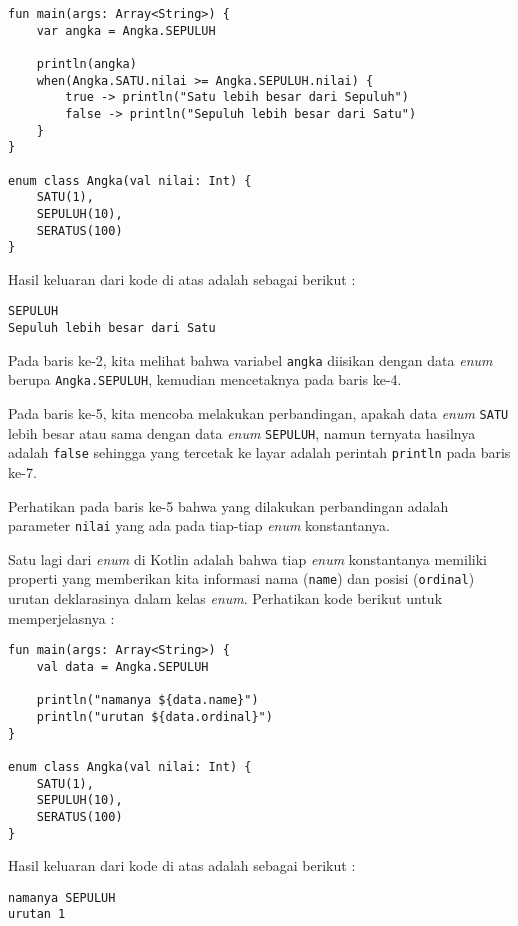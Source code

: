 \begin{lstlisting}
fun main(args: Array<String>) {
	var angka = Angka.SEPULUH
	
	println(angka)
	when(Angka.SATU.nilai >= Angka.SEPULUH.nilai) {
		true -> println("Satu lebih besar dari Sepuluh")
		false -> println("Sepuluh lebih besar dari Satu")
	}
}

enum class Angka(val nilai: Int) {
	SATU(1),
	SEPULUH(10),
	SERATUS(100)
}
\end{lstlisting}

Hasil keluaran dari kode di atas adalah sebagai berikut :

\begin{lstlisting}
SEPULUH
Sepuluh lebih besar dari Satu
\end{lstlisting}

Pada baris ke-2, kita melihat bahwa variabel \texttt{angka} diisikan dengan data \textit{enum} berupa \texttt{Angka.SEPULUH}, kemudian mencetaknya pada baris ke-4.

Pada baris ke-5, kita mencoba melakukan perbandingan, apakah data \textit{enum} \texttt{SATU} lebih besar atau sama dengan data \textit{enum} \texttt{SEPULUH}, namun ternyata hasilnya adalah \texttt{false} sehingga yang tercetak ke layar adalah perintah \texttt{println} pada baris ke-7.

Perhatikan pada baris ke-5 bahwa yang dilakukan perbandingan adalah parameter \texttt{nilai} yang ada pada tiap-tiap \textit{enum} konstantanya.

Satu lagi dari \textit{enum} di Kotlin adalah bahwa tiap \textit{enum} konstantanya memiliki properti yang memberikan kita informasi nama (\texttt{name}) dan posisi (\texttt{ordinal}) urutan deklarasinya dalam kelas \textit{enum}. Perhatikan kode berikut untuk memperjelasnya :

\begin{lstlisting}
fun main(args: Array<String>) {
	val data = Angka.SEPULUH
	
	println("namanya ${data.name}")
	println("urutan ${data.ordinal}")
}

enum class Angka(val nilai: Int) {
	SATU(1),
	SEPULUH(10),
	SERATUS(100)
}
\end{lstlisting}

Hasil keluaran dari kode di atas adalah sebagai berikut :

\begin{lstlisting}
namanya SEPULUH
urutan 1
\end{lstlisting}


